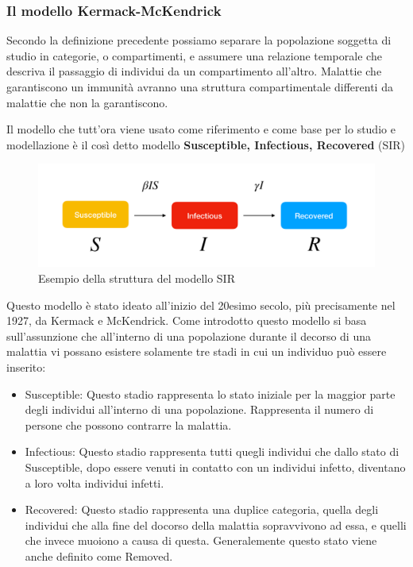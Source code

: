 \subsubsection{Il modello Kermack-McKendrick}
Secondo la definizione precedente possiamo separare la popolazione soggetta di studio 
in categorie, o compartimenti, e assumere una relazione temporale che descriva il passaggio 
di individui da un compartimento all'altro. Malattie che garantiscono un immunità avranno 
una struttura compartimentale differenti da malattie che non la garantiscono.

Il modello che tutt'ora viene usato come riferimento e come base per 
lo studio e modellazione è il così detto modello 
\textbf{Susceptible, Infectious, Recovered} (SIR)

\begin{figure}[h]
    \includegraphics[width=\linewidth]{img/sir.png}
    \caption{Esempio della struttura del modello SIR} 
    \label{fig:SIR_Structure}
\end{figure}

Questo modello è stato ideato all'inizio del 20esimo secolo, 
più precisamente nel 1927, da Kermack e McKendrick. Come introdotto questo modello
si basa sull'assunzione che all'interno di una popolazione durante 
il decorso di una malattia vi possano esistere solamente tre stadi in cui 
un individuo può essere inserito: 

\begin{itemize}
    \item Susceptible: Questo stadio rappresenta lo stato iniziale per la maggior parte
    degli individui all'interno di una popolazione. Rappresenta il numero di 
    persone che possono contrarre la malattia.
    \item Infectious: Questo stadio rappresenta tutti quegli individui che dallo 
    stato di Susceptible, dopo essere venuti in contatto con un individui infetto, 
    diventano a loro volta individui infetti.
    \item Recovered: Questo stadio rappresenta una duplice categoria, quella degli
    individui che alla fine del docorso della malattia sopravvivono ad essa, e 
    quelli che invece muoiono a causa di questa. Generalemente questo stato viene
    anche definito come Removed.
\end{itemize}

